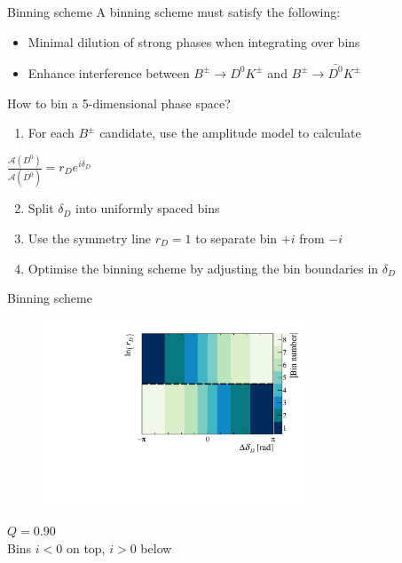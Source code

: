 \documentclass{beamer}
\begin{document}
\begin{frame}{Binning scheme}
  \vspace{0.0cm}
  {\Large A binning scheme must satisfy the following:}
  \begin{itemize}
    \item{Minimal dilution of strong phases when integrating over bins}
    \item{Enhance interference between $B^\pm\to D^0K^\pm$ and $B^\pm\to\bar{D^0}K^\pm$}
  \end{itemize}
  \vspace{0.4cm}
  {\Large How to bin a 5-dimensional phase space?}
  \begin{enumerate}
    \item{For each $B^\pm$ candidate, use the amplitude model to calculate}
  \end{enumerate}
  \begin{center}
    {\Large $\frac{\mathcal{A}(D^0)}{\mathcal{A}(\bar{D^0})} = r_De^{i\delta_D}$}
  \end{center}
  \begin{enumerate}
    \setcounter{enumi}{1}
    \setlength\itemsep{0.5em}
    \item{Split $\delta_D$ into uniformly spaced bins}
    \item{Use the symmetry line $r_D = 1$ to separate bin $+i$ from $-i$}
    \item{Optimise the binning scheme by adjusting the bin boundaries in $\delta_D$}
  \end{enumerate}
\end{frame}

\begin{frame}{Binning scheme}
  \begin{figure}
    \centering
    \includegraphics[width = 0.7\textwidth]{Plots/BinningSchemePlot_8Bins.pdf}
  \end{figure}
  \vspace{-1.0cm}
  \begin{center}
    $Q = 0.90$ \\
    Bins $i < 0$ on top, $i > 0$ below
  \end{center}
\end{frame}
\end{document}
